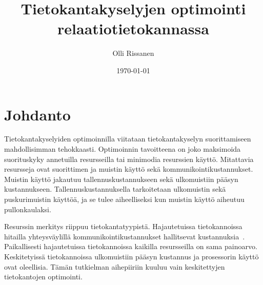 \documentclass[finnish]{tktltiki2}
\title{Tietokantakyselyjen optimointi relaatiotietokannassa}
\author{Olli Rissanen}
\date{\today}
\theoremstyle{definition}
\theoremstyle{remark}
\begin{document}

\maketitle        %
\makeabstract     %

\tableofcontents  %
\newpage          %



\section{Johdanto}
Tietokantakyselyiden optimoinnilla viitataan tietokantakyselyn suorittamiseen mahdollisimman tehokkaasti. Optimoinnin tavoitteena on joko maksimoida suorituskyky annetuilla resursseilla tai minimodia resurssien käyttö. Mitattavia resursseja ovat suorittimen ja muistin käyttö sekä kommunikointikustannukset. Muistin käyttö jakautuu tallennuskustannukseen sekä ulkomuistiin pääsyn kustannukseen. Tallennuskustannuksella tarkoitetaan ulkomuistin sekä puskurimuistin käyttöä, ja se tulee aiheelliseksi kun muistin käyttö aiheutuu pullonkaulaksi. 

Resurssin merkitys riippuu tietokantatyypistä. Hajautetuissa tietokannoissa hitailla yhteysväylillä kommunikointikustannukset hallitsevat kustannuksia~\cite{eka}. Paikallisesti hajautetuissa tietokannoissa kaikilla resursseilla on sama painoarvo. Keskitetyissä tietokannoissa ulkomuistiin pääsyn kustannus ja prosessorin käyttö ovat oleellisia. Tämän tutkielman aihepiiriin kuuluu vain keskitettyjen tietokantojen optimointi.



%
%
% 
%



\end{document}
